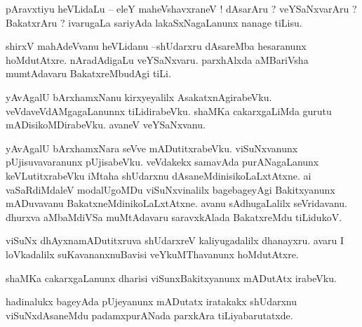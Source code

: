 \documentclass{article}
\begin{document}

\begin{mn}%
pAravxtiyu heVLidaLu -- eleY maheVshavxraneV ! dAsarAru ? veYSaNxvarAru ? BakatxrAru ? ivarugaLa 
sariyAda lakaSxNagaLanunx nanage tiLisu.
\end{mn}

\begin{mn}%
shirxV mahAdeVvanu heVLidanu --shUdarxru dAsareMba hesaranunx hoMdutAtxre. nAradAdigaLu 
veYSaNxvaru. parxhAlxda aMBariVsha mumtAdavaru BakatxreMbudAgi tiLi.
\end{mn}

\begin{mn}%
yAvAgalU bArxhamxNanu kirxyeyalilx AsakatxnAgirabeVku. veVdaveVdAMgagaLanunnx tiLidirabeVku. shaMKa 
cakarxgaLiMda gurutu mADisikoMDirabeVku. avaneV veYSaNxvanu.
\end{mn}

\begin{mn}%
yAvAgalU bArxhamxNara seVve mADutitxrabeVku. viSuNxvanunx pUjisuvavaranunx pUjisabeVku. veVdakekx 
samavAda purANagaLanunx keVLutitxrabeVku iMtaha shUdarxnu dAsaneMdinisikoLaLxtAtxne. ai 
vaSaRdiMdaleV modalUgoMDu viSuNxvinalilx bagebageyAgi Bakitxyanunx mADuvavanu 
BakatxneMdinikoLaLxtAtxne. avanu sAdhugaLalilx seVridavanu. dhurxva aMbaMdiVSa muMtAdavaru 
saravxkAlada BakatxreMdu tiLidukoV.
\end{mn}

\begin{mn}%
viSuNx dhAyxnamADutitxruva shUdarxreV kaliyugadalilx dhanayxru. avaru I loVkadalilx 
suKavananxnuBavisi veYkuMThavanunx hoMdutAtxre.
\end{mn}

\begin{mn}%
shaMKa cakarxgaLanunx dharisi viSunxBakitxyanunx mADutAtx irabeVku.
\end{mn}

\begin{mn}%
hadinalukx bageyAda pUjeyanunx mADutatx iratakakx shUdarxnu viSuNxdAsaneMdu padamxpurANada parxkAra 
tiLiyabarutatxde.
\end{mn}

\end{document}
